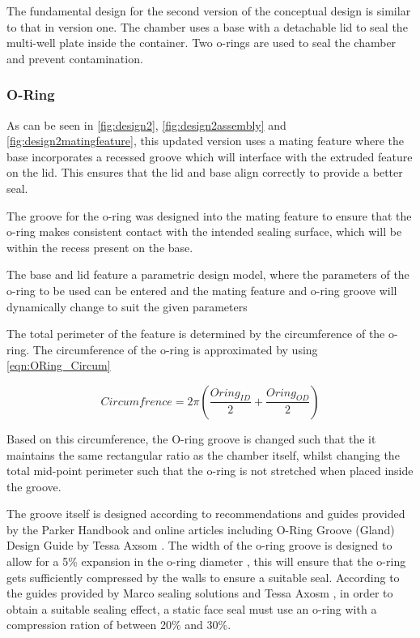 \documentclass[class=report,11pt,crop=false]{standalone}
\begin{document}
The fundamental design for the second version of the conceptual design is similar to that in version one. The chamber uses a base with a detachable lid to seal the multi-well plate inside the container. Two o-rings are used to seal the chamber and prevent contamination.

\subsubsection{O-Ring}


As can be seen in \autoref{fig:design2}, \autoref{fig:design2assembly} and \autoref{fig:design2matingfeature}, this updated version uses a mating feature where the base incorporates a recessed groove which will interface with the extruded feature on the lid. This ensures that the lid and base align correctly to provide a better seal. 

The groove for the o-ring was designed into the mating feature to ensure that the o-ring makes consistent contact with the intended sealing surface, which will be within the recess present on the base.

The base and lid feature a parametric design model, where the parameters of the o-ring to be used can be entered and the mating feature and o-ring groove will dynamically change to suit the given parameters

The total perimeter of the feature is determined by the circumference of the o-ring. The circumference of the o-ring is approximated by using \autoref{eqn:ORing_Circum}

\begin{equation}
	Circumfrence=2\pi(\frac{Oring_{ID}}{2}+\frac{Oring_{OD}}{2})
	\label{eqn:ORing_Circum}
\end{equation}

Based on this circumference, the O-ring groove is changed such that the it maintains the same rectangular ratio as the chamber itself, whilst changing the total mid-point perimeter such that the o-ring is not stretched when placed inside the groove.

The groove itself is designed according to recommendations and guides provided by the Parker Handbook \cite{ORingHandbook} and online articles including O-Ring Groove (Gland) Design Guide by Tessa Axsom \cite{axsomORingGrooveGland2022}. The width of the o-ring groove is designed to allow for a 5\% expansion in the o-ring diameter \cite{axsomORingGrooveGland2022}, this will ensure that the o-ring gets sufficiently compressed by the walls to ensure a suitable seal. According to the guides provided by Marco sealing solutions \cite{UnderstandingORingSqueeze} and Tessa Axosm \cite{axsomORingGrooveGland2022}, in order to obtain a suitable sealing effect, a static face seal must use an o-ring with a compression ration of between 20\% and 30\%. 
\end{document}
